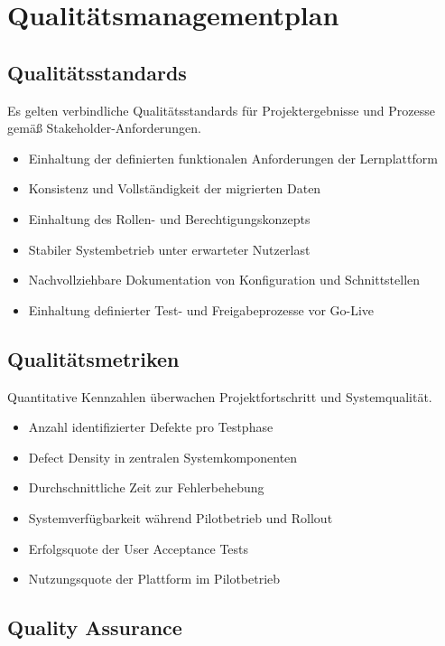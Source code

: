 \section{Qualitätsmanagementplan}

\subsection{Qualitätsstandards}

Es gelten verbindliche Qualitätsstandards für Projektergebnisse und Prozesse gemäß Stakeholder-Anforderungen.

\begin{itemize}
    \item Einhaltung der definierten funktionalen Anforderungen der Lernplattform
    \item Konsistenz und Vollständigkeit der migrierten Daten
    \item Einhaltung des Rollen- und Berechtigungskonzepts
    \item Stabiler Systembetrieb unter erwarteter Nutzerlast
    \item Nachvollziehbare Dokumentation von Konfiguration und Schnittstellen
    \item Einhaltung definierter Test- und Freigabeprozesse vor Go-Live
\end{itemize}

\subsection{Qualitätsmetriken}

Quantitative Kennzahlen überwachen Projektfortschritt und Systemqualität.

\begin{itemize}
    \item Anzahl identifizierter Defekte pro Testphase
    \item Defect Density in zentralen Systemkomponenten
    \item Durchschnittliche Zeit zur Fehlerbehebung
    \item Systemverfügbarkeit während Pilotbetrieb und Rollout
    \item Erfolgsquote der User Acceptance Tests
    \item Nutzungsquote der Plattform im Pilotbetrieb
\end{itemize}

\subsection{Quality Assurance}


